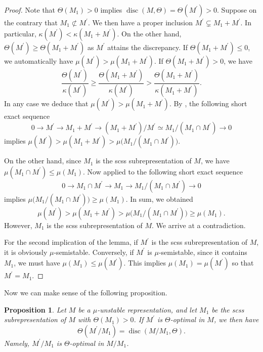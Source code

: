 \documentclass[a4paper]{amsart}
\numberwithin{equation}{section}
\theoremstyle{plain}
\newtheorem{proposition}[theorem]{Proposition}
\theoremstyle{definition}
\DeclareMathOperator{\disc}{disc}
\begin{document}
\begin{proof}
Note that $\Theta(M_1)>0$ implies $\disc(M,\Theta)=\Theta(M^{\prime})>0$. 
Suppose on the contrary that $M_{1}\not\subset M^{\prime}$. We then have a proper inclusion $M^{\prime}\subsetneq M_{1}+M^{\prime}$. In particular, $\kappa(M^{\prime})<\kappa(M_{1}+M^{\prime})$. On the other hand, $\Theta(M^{\prime})\geq \Theta(M_{1}+M^{\prime})$ as $M^{\prime}$ attains the discrepancy. If $\Theta(M_1+M^{\prime})\leq 0$, we automatically have $\mu( M^{\prime})>\mu(M_1+M^{\prime}).$ If $\Theta(M_1+M^{\prime})>0$, we have 
$$\frac{\Theta(M^{\prime})}{\kappa(M^{\prime})}\geq \frac{\Theta(M_1+M^{\prime})}{\kappa(M^{\prime})}>\frac{\Theta(M_1+M^{\prime})}{\kappa(M_1+M^{\prime})}.$$ In any case we deduce that $\mu(M^{\prime})>\mu(M_{1}+M^{\prime})$. By , the following short exact sequence 
$$
0\rightarrow M^{\prime}\rightarrow M_{1}+M^{\prime}\rightarrow (M_{1}+M^{\prime})/M^{\prime}\simeq M_{1}/(M_{1}\cap M^{\prime})\rightarrow 0$$ implies $\mu(M^{\prime})>\mu(M_{1}+M^{\prime})>\mu\big(M_{1}/(M_{1}\cap M^{\prime})\big)$.

On the other hand, since $M_1$ is the scss subrepresentation of $M$, we have $\mu(M_{1}\cap M^{\prime})\leq \mu(M_1)$. Now  applied to the following short exact sequence 
$$0\rightarrow M_{1}\cap M^{\prime}\rightarrow M_{1}\rightarrow M_{1}/(M_{1}\cap M^{\prime})\rightarrow 0$$ implies 
$\mu\big(M_{1}/(M_{1}\cap M^{\prime})\big)\geq \mu(M_{1})$. In sum, we obtained 
$$\mu(M^{\prime})>\mu(M_{1}+M^{\prime})>\mu\big(M_{1}/(M_{1}\cap M^{\prime})\big)\geq \mu(M_{1}).$$ However, $M_{1}$ is the  scss subrepresentation of $M$. We arrive at a contradiction.

For the second implication of the lemma, if $M^{\prime}$ is the scss subrepresentation of $M$, it is obviously $\mu$-semistable. Conversely, if $M^{\prime}$ is $\mu$-semistable, since it contains $M_1$, we must have $\mu(M_1)\leq \mu(M^{\prime})$. This implies $\mu(M_1)=\mu(M^{\prime})$ so that $M^{\prime} = M_1$.
\end{proof}

Now we can make sense of the following proposition.

\begin{proposition}\label{dsicrepancy_preserved_quotient_by_M_1}
Let $M$ be a $\mu$-unstable representation, and let  $M_1$ be the scss subrepresentation of $M$ with $\Theta(M_1)>0$. If $M^{\prime}$ is $\Theta$-optimal in $M$, we then have $$\Theta(M^{\prime}/M_1)=\disc(M/M_1,\Theta).$$ Namely, $M^{\prime}/M_1$ is $\Theta$-optimal in $M/M_1$.
\end{proposition}
\end{document}
